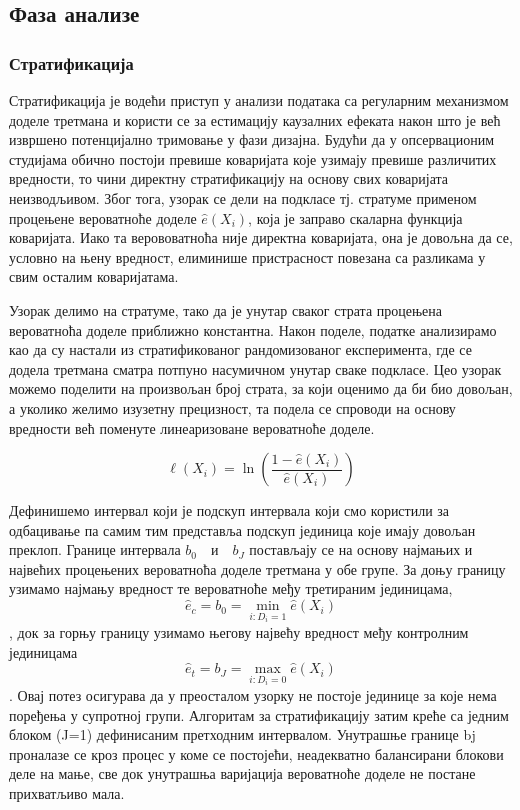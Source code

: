\documentclass[12pt, a4paper]{article}
\begin{document}
\subsection{Фаза анализе}
\subsubsection{Стратификација}
Стратификација је водећи приступ у анализи података са регуларним механизмом доделе третмана и користи се за естимацију каузалних ефеката након што је већ извршено потенцијално тримовање у фази дизајна. 
Будући да у опсервационим студијама обично постоји превише коваријата које узимају превише различитих вредности, то чини директну стратификацију на основу свих коваријата неизводљивом. Због тога, узорак се дели на подкласе тј. стратуме применом процењене вероватноће доделе $ \hat{e}(X_i)$, која је заправо скаларна функција коваријата. Иако та верововатноћа није директна коваријата, она је довољна да се, условно на њену вредност, елиминише пристрасност повезана са разликама у свим осталим коваријатама.

Узорак  делимо на стратуме, тако да је унутар сваког страта процењена вероватноћа доделе приближно константна.  Након поделе, податке анализирамо као да су настали из стратификованог рандомизованог експеримента, где се додела третмана сматра потпуно насумичном унутар сваке подкласе. Цео узорак можемо поделити на произвољан број страта, за који оценимо да би био довољан, а уколико желимо изузетну прецизност, та подела се спроводи на основу вредности већ поменуте линеаризоване вероватноће доделе.

$$\ell(X_i) = \ln \left( \frac{1 - \hat{e}(X_i)}{\hat{e}(X_i)} \right)$$

Дефинишемо интервал који је подскуп интервала који смо користили за одбацивање па самим тим представља подскуп јединица које имају довољан преклоп.
Границе интервала $b_0 \quad \text{и} \quad b_J$ постављају се на основу најмањих и највећих процењених вероватноћа доделе третмана у обе групе.  За доњу границу узимамо најмању вредност те вероватноће међу третираним јединицама, $$\hat{e}_c = b_0 = \min_{i: D_i = 1} \hat{e}(X_i)$$, док за горњу границу узимамо његову највећу вредност међу контролним јединицама $$\hat{e}_t = b_J = \max_{i: D_i = 0} \hat{e}(X_i)$$. Овај потез осигурава да у преосталом узорку не постоје јединице за које нема поређења у супротној групи. Алгоритам за стратификацију затим креће са једним блоком (J=1) дефинисаним претходним интервалом. Унутрашње границе bj проналазе се кроз процес у коме се постојећи, неадекватно балансирани блокови деле на мање, све док унутрашња варијација вероватноће доделе не постане прихватљиво мала.
\end{document}
